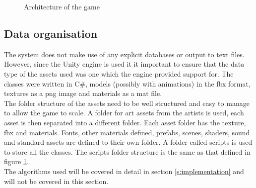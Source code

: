 \documentclass[11pt,a4paper]{article}
\begin{document}
\begin{figure}[H]
    \caption{Architecture of the game}
    \label{fig:architecture}
\end{figure}
\subsection{Data organisation}
The system does not make use of any explicit databases or output to text files. However, since the Unity engine is used it it important to ensure that the data type of the assets used was one which the engine provided support for. The classes were written in C\#, models (possibly with animations) in the fbx format, textures as a png image and materials as a mat file.\smallskip\\
The folder structure of the assets need to be well structured and easy to manage to allow the game to scale. A folder for art assets from the artists is used, each asset is then separated into a different folder. Each asset folder has the texture, fbx and materials. Fonts, other materials defined, prefabs, scenes, shaders, sound and standard assets are defined to their own folder. A folder called scripts is used to store all the classes. The scripts folder structure is the same as that defined in figure \ref{fig:architecture}.\smallskip\\
The algorithms used will be covered in detail in section \ref{s:implementation} and will not be covered in this section.
\end{document}

